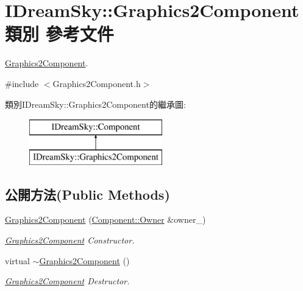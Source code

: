 \hypertarget{class_i_dream_sky_1_1_graphics2_component}{}\section{I\+Dream\+Sky\+:\+:Graphics2\+Component 類別 參考文件}
\label{class_i_dream_sky_1_1_graphics2_component}


\hyperlink{class_i_dream_sky_1_1_graphics2_component}{Graphics2\+Component}.  




{\ttfamily \#include $<$Graphics2\+Component.\+h$>$}

類別\+I\+Dream\+Sky\+:\+:Graphics2\+Component的繼承圖\+:\begin{figure}[H]
\begin{center}
\leavevmode
\includegraphics[height=2.000000cm]{class_i_dream_sky_1_1_graphics2_component}
\end{center}
\end{figure}
\subsection*{公開方法(Public Methods)}
\begin{DoxyCompactItemize}
\item 
\hyperlink{class_i_dream_sky_1_1_graphics2_component_aefdd6c6b5d82d8ab77fdf4d2d8d36658}{Graphics2\+Component} (\hyperlink{class_i_dream_sky_1_1_component_1_1_owner}{Component\+::\+Owner} \&owner\+\_\+)
\begin{DoxyCompactList}\small\item\em \hyperlink{class_i_dream_sky_1_1_graphics2_component}{Graphics2\+Component} Constructor. \end{DoxyCompactList}\item 
virtual \hyperlink{class_i_dream_sky_1_1_graphics2_component_a5e555f6f2d1383c5a834216d01617ab5}{$\sim$\+Graphics2\+Component} ()
\begin{DoxyCompactList}\small\item\em \hyperlink{class_i_dream_sky_1_1_graphics2_component}{Graphics2\+Component} Destructor. \end{DoxyCompactList}\end{DoxyCompactItemize}


